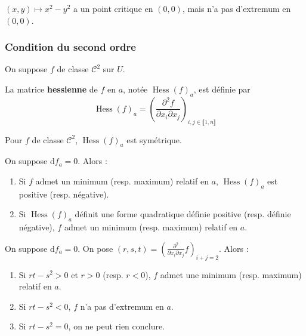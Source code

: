   \begin{cexample}
    $(x,y) \mapsto x^2-y^2$ a un point critique en $(0,0)$, mais n'a pas d'extremum en $(0,0)$.
  \end{cexample}

  \subsubsection{Condition du second ordre}


  On suppose $f$ de classe $\mathcal{C}^2$ sur $U$.

  \begin{definition}
    La matrice \textbf{hessienne} de $f$ en $a$, notée $\operatorname{Hess}(f)_a$, est définie par
    \[ \operatorname{Hess}(f)_a = \left( \frac{\partial^2 f}{\partial x_i \partial x_j} \right)_{i,j \in \llbracket 1, n \rrbracket} \]
  \end{definition}

  \begin{remark}
    Pour $f$ de classe $\mathcal{C}^2$, $\operatorname{Hess}(f)_a$ est symétrique.
  \end{remark}

  \begin{theorem}
    On suppose $\mathrm{d}f_a = 0$. Alors :
    \begin{enumerate}[label=(\roman*)]
      \item Si $f$ admet un minimum (resp. maximum) relatif en $a$, $\operatorname{Hess}(f)_a$ est positive (resp. négative).
      \item Si $\operatorname{Hess}(f)_a$ définit une forme quadratique définie positive (resp. définie négative), $f$ admet un minimum (resp. maximum) relatif en $a$.
    \end{enumerate}
  \end{theorem}

  \begin{example}
    On suppose $\mathrm{d}f_a = 0$. On pose $(r,s,t) = \left(  \frac{\partial^2}{\partial x_i \partial x_j} f \right)_{i+j=2}$. Alors :
    \begin{enumerate}[label=(\roman*)]
      \item Si $rt-s^2 > 0$ et $r > 0$ (resp. $r < 0$), $f$ admet une minimum (resp. maximum) relatif en $a$.
      \item Si $rt-s^2 < 0$, $f$ n'a pas d'extremum en $a$.
      \item Si $rt-s^2 = 0$, on ne peut rien conclure.
    \end{enumerate}
  \end{example}

